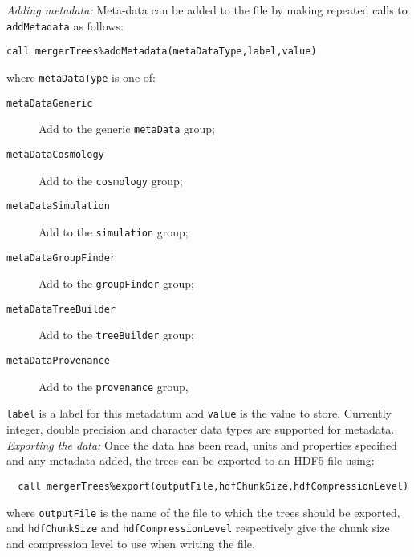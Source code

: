 \noindent \emph{Adding metadata:} Meta-data can be added to the file by making repeated calls to {\tt addMetadata} as follows:
\begin{verbatim}
call mergerTrees%addMetadata(metaDataType,label,value)
\end{verbatim}
where {\tt metaDataType} is one of:
\begin{description}
 \item [{\tt metaDataGeneric}] Add to the generic {\tt metaData} group;
 \item [{\tt metaDataCosmology}] Add to the {\tt cosmology} group;
 \item [{\tt metaDataSimulation}] Add to the {\tt simulation} group;
 \item [{\tt metaDataGroupFinder}] Add to the {\tt groupFinder} group;
 \item [{\tt metaDataTreeBuilder}] Add to the {\tt treeBuilder} group;
 \item [{\tt metaDataProvenance}] Add to the {\tt provenance} group,
\end{description}
{\tt label} is a label for this metadatum and {\tt value} is the value to store. Currently integer, double precision and character data types are supported for metadata.\\

\noindent \emph{Exporting the data:} Once the data has been read, units and properties specified and any metadata added, the trees can be exported to an HDF5 file using:
\begin{verbatim}
  call mergerTrees%export(outputFile,hdfChunkSize,hdfCompressionLevel)
\end{verbatim}
where {\tt outputFile} is the name of the file to which the trees should be exported, and {\tt hdfChunkSize} and {\tt hdfCompressionLevel} respectively give the chunk size and compression level to use when writing the file.
